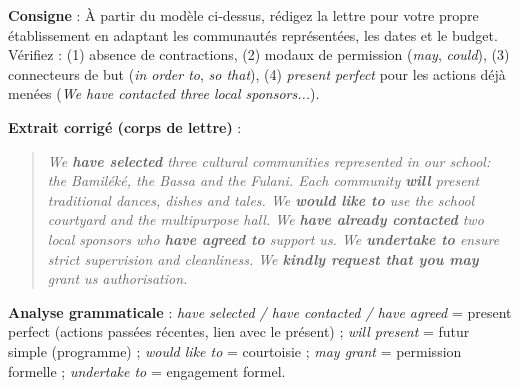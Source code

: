 \documentclass[11pt]{article}
\newcommand{\cle}[1]{{\popxbold\color{popdark}#1}}
\begin{document}
\begin{exoresolu}
\textbf{Consigne} : À partir du modèle ci-dessus, rédigez la lettre pour votre propre établissement en adaptant les communautés représentées, les dates et le budget. Vérifiez : (1) absence de contractions, (2) modaux de permission (\emph{may}, \emph{could}), (3) connecteurs de but (\emph{in order to}, \emph{so that}), (4) \emph{present perfect} pour les actions déjà menées (\emph{We have contacted three local sponsors...}).

\textbf{Extrait corrigé (corps de lettre)} :
\begin{quote}
\emph{We \textbf{have selected} three cultural communities represented in our school: the Bamiléké, the Bassa and the Fulani. Each community \textbf{will} present traditional dances, dishes and tales. We \textbf{would like to} use the school courtyard and the multipurpose hall. We \textbf{have already contacted} two local sponsors who \textbf{have agreed to} support us. We \textbf{undertake to} ensure strict supervision and cleanliness. We \textbf{kindly request that you may} grant us authorisation.}
\end{quote}
\textbf{Analyse grammaticale} : \emph{have selected / have contacted / have agreed} = \cle{present perfect} (actions passées récentes, lien avec le présent) ; \emph{will present} = futur simple (programme) ; \emph{would like to} = courtoisie ; \emph{may grant} = permission formelle ; \emph{undertake to} = engagement formel.
\end{exoresolu}
\end{document}
